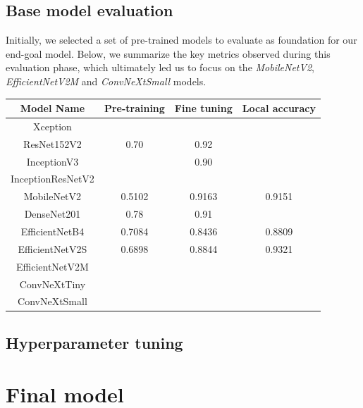 \documentclass[11pt]{article}
\begin{document}
\subsection{Base model evaluation}

Initially, we selected a set of pre-trained models to evaluate as foundation for our end-goal model.
Below, we summarize the key metrics observed during this evaluation phase, which ultimately led us to focus on the \textit{MobileNetV2}, \textit{EfficientNetV2M} and \textit{ConvNeXtSmall} models.

\begin{table}[h!]
    \centering
    \begin{tabular}{|c|c|c|c|}
        \hline
        \textbf{Model Name} & \textbf{Pre-training} & \textbf{Fine tuning} & \textbf{Local accuracy} \\ \hline
        Xception            &  &  & \\ \hline
        ResNet152V2         & 0.70 & 0.92 & \\ \hline
        InceptionV3         &  & 0.90 & \\ \hline
        InceptionResNetV2   &  &  & \\ \hline
        MobileNetV2         & 0.5102 & 0.9163 & 0.9151 \\ \hline
        DenseNet201         & 0.78 & 0.91 & \\ \hline
        EfficientNetB4      & 0.7084 & 0.8436 & 0.8809 \\ \hline
        EfficientNetV2S     & 0.6898 & 0.8844 & 0.9321 \\ \hline
        EfficientNetV2M     &  &  & \\ \hline
        ConvNeXtTiny        &  &  & \\ \hline
        ConvNeXtSmall       &  &  & \\ \hline
    \end{tabular}
\end{table}

\subsection{Hyperparameter tuning}


\section{Final model}

\end{document}
